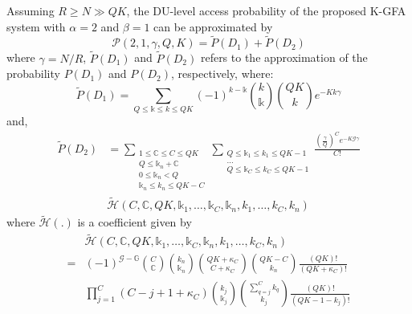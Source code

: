 \documentclass[a4paper]{IEEEtran}
\begin{document}
Assuming $R \geq N \gg QK$, the DU-level access probability of the proposed K-GFA system with $\alpha=2$ and $\beta=1$ can be approximated by 
\begin{equation}
\mathcal{P}(2, 1, \gamma, Q, K) = \widetilde{P}(D_1) + \widetilde{P}(D_2)
\label{eq: approximation}
\end{equation}
where $\gamma = N/R$, $\widetilde{P}(D_1)$ and $\widetilde{P}(D_2)$ refers to the approximation of the probability $P({D_1})$ and $P(D_2)$, respectively, where:
\begin{equation}
\widetilde{P}(D_1) = \sum\limits_{Q\leq \mathbb{k} \leq k \leq QK} (-1)^{k-\mathbb{k}} {k \choose \mathbb{k}} {QK \choose k} e^{-Kk\gamma}
\label{eq: approximation of D_1}
\end{equation}
and,
\begin{equation}
\begin{split}
\widetilde{P}(D_2) & = 
\sum\limits_{
\substack{
1 \leq \mathbb{C} \leq C \leq QK\\
Q \leq \mathbb{k}_n + \mathbb{C}\\
0 \leq \mathbb{k}_n < Q\\
\mathbb{k}_n \leq k_n \leq QK - C
}
}
\sum\limits_{
\substack{
Q \leq \mathbb{k}_1 \leq k_1 \leq QK - 1\\
\dots\\
Q \leq \mathbb{k}_C \leq k_C \leq QK - 1
}}
\frac{(\frac{\gamma}{Q})^{C} e^{-K\mathcal{G}\gamma}}{C!} \\
&\widetilde{\mathcal{H}}(C, \mathbb{C}, QK, \mathbb{k}_{1}, \dots, \mathbb{k}_{C}, \mathbb{k}_{n}, k_{1}, \dots, k_{C}, k_{n})
\end{split}
\label{eq: Theorem 1}
\end{equation}
where $\widetilde{\mathcal{H}}(.)$ is a coefficient given by
\begin{equation}
\begin{split}
&\widetilde{\mathcal{H}}(C, \mathbb{C}, QK, \mathbb{k}_{1}, \dots, \mathbb{k}_{C}, \mathbb{k}_{n}, k_{1}, \dots, k_{C}, k_{n}) \\
= &(-1)^{\mathcal{G} - \mathbb{G}}
{C \choose \mathbb{C}}
{k_n \choose \mathbb{k}_n}{QK + \kappa_C \choose C + \kappa_C} {QK - C \choose k_n} \frac{(QK)!}{(QK + \kappa_C)!}
\\
&\prod^{C}_{j = 1}(C - j + 1 + \kappa_C) {k_j \choose \mathbb{k}_j} {\sum^{C}_{q = j} k_q \choose k_j} \frac{(QK)!}{(QK - 1 - k_j)!}
\label{eq: approx H}
\end{split}
\end{equation}
\end{document}
